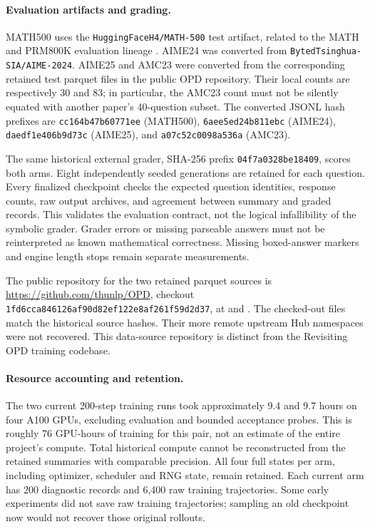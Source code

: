 \paragraph{Evaluation artifacts and grading.}
MATH500 uses the \texttt{HuggingFaceH4/MATH-500} test artifact, related to the MATH and PRM800K evaluation lineage \citep{math,prm800k}. AIME24 was converted from \texttt{BytedTsinghua-SIA/AIME-2024}. AIME25 and AMC23 were converted from the corresponding retained test parquet files in the public OPD repository. Their local counts are respectively 30 and 83; in particular, the AMC23 count must not be silently equated with another paper's 40-question subset. The converted JSONL hash prefixes are \texttt{cc164b47b60771ee} (MATH500), \texttt{6aee5ed24b811ebc} (AIME24), \texttt{daedf1e406b9d73c} (AIME25), and \texttt{a07c52c0098a536a} (AMC23).

The same historical external grader, SHA-256 prefix \texttt{04f7a0328be18409}, scores both arms. Eight independently seeded generations are retained for each question. Every finalized checkpoint checks the expected question identities, response counts, raw output archives, and agreement between summary and graded records. This validates the evaluation contract, not the logical infallibility of the symbolic grader. Grader errors or missing parseable answers must not be reinterpreted as known mathematical correctness. Missing boxed-answer markers and engine length stops remain separate measurements.

The public repository for the two retained parquet sources is \url{https://github.com/thunlp/OPD}, checkout \texttt{1fd6cca846126af90d82ef122e8af261f59d2d37}, at  and . The checked-out files match the historical source hashes. Their more remote upstream Hub namespaces were not recovered. This data-source repository is distinct from the Revisiting OPD training codebase.

\paragraph{Resource accounting and retention.}
The two current 200-step training runs took approximately 9.4 and 9.7 hours on four A100 GPUs, excluding evaluation and bounded acceptance probes. This is roughly 76 GPU-hours of training for this pair, not an estimate of the entire project's compute. Total historical compute cannot be reconstructed from the retained summaries with comparable precision. All four full states per arm, including optimizer, scheduler and RNG state, remain retained. Each current arm has 200 diagnostic records and 6,400 raw training trajectories. Some early experiments did not save raw training trajectories; sampling an old checkpoint now would not recover those original rollouts.

